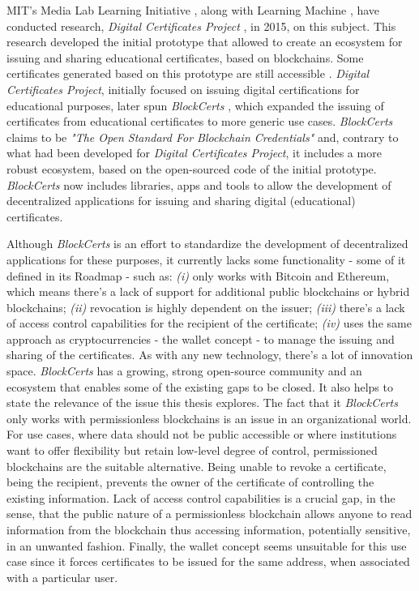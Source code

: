 MIT's Media Lab Learning Initiative \cite{mit_learning_initiative}, along with Learning Machine \cite{learning_machine}, have conducted research, \textit{Digital Certificates Project} \cite{MITCertificates}, in 2015, on this subject. This research developed the initial prototype that allowed to create an ecosystem for issuing and sharing educational certificates, based on blockchains. Some certificates generated based on this prototype are still accessible \cite{MITCertificatesBootcamp}. \textit{Digital Certificates Project}, initially focused on issuing digital certifications for educational purposes, later spun \textit{BlockCerts} \cite{Blockcerts}, which expanded the issuing of certificates from educational certificates to more generic use cases. \textit{BlockCerts} claims to be \textit{"The Open Standard For Blockchain Credentials"} and, contrary to what had been developed for \textit{Digital Certificates Project}, it includes a more robust ecosystem, based on the open-sourced code of the initial prototype. \textit{BlockCerts} now includes libraries, apps and tools to allow the development of decentralized  applications for issuing and sharing digital (educational) certificates.

Although \textit{BlockCerts} is an effort to standardize the development of decentralized applications for these purposes, it currently lacks some functionality - some of it defined in its Roadmap - such as: \emph{(i)} only works with Bitcoin and Ethereum, which means there's a lack of support for additional public blockchains or hybrid blockchains; \emph{(ii)} revocation is highly dependent on the issuer; \emph{(iii)} there's a lack of access control capabilities for the recipient of the certificate; \emph{(iv)} uses the same approach as cryptocurrencies - the wallet concept - to manage the issuing and sharing of the certificates. As with any new technology, there's a lot of innovation space. \textit{BlockCerts} has a growing, strong open-source community and an ecosystem that enables some of the existing gaps to be closed. It also helps to state the relevance of the issue this thesis explores. The fact that it \emph{BlockCerts} only works with permissionless blockchains is an issue in an organizational world. For use cases, where data should not be public accessible or where institutions want to offer flexibility but retain low-level degree of control, permissioned blockchains are the suitable alternative. Being unable to revoke a certificate, being the recipient, prevents the owner of the certificate of controlling the existing information. Lack of access control capabilities is a crucial gap, in the sense, that the public nature of a permissionless blockchain allows anyone to read information from the blockchain thus accessing information, potentially sensitive, in an unwanted fashion. Finally, the wallet concept seems unsuitable for this use case since it forces certificates to be issued for the same address, when associated with a particular user.

